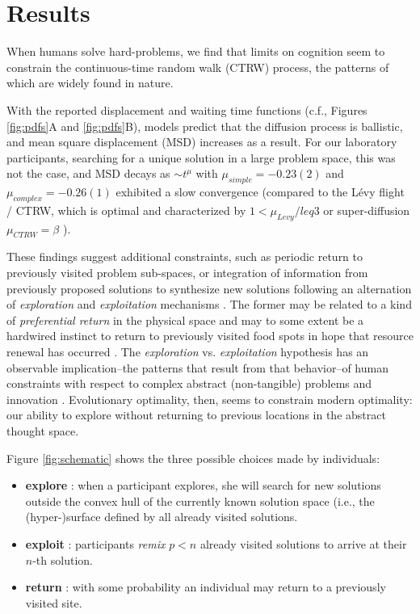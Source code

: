 \section{Results}
When humans solve hard-problems, we find that limits on cognition seem to constrain the continuous-time random walk (CTRW) process, the patterns of which are widely found in nature. 


With the reported displacement and waiting time functions (c.f., Figures \ref{fig:pdfs}A and \ref{fig:pdfs}B), models predict that the diffusion process is ballistic, and mean square displacement (MSD) increases as a result. For our laboratory participants, searching for a unique solution in a large problem space, this was not the case, and MSD decays as $\sim t^{\mu}$ with $\mu_{simple} =-0.23(2)$ and $\mu_{complex} =- 0.26(1)$ exhibited a slow convergence (compared to the L\'evy flight / CTRW, which is optimal and characterized by $1<\mu_{Levy} /leq 3$ or super-diffusion $\mu_{CTRW} = \beta$ \cite{21,23}). 

These findings suggest additional constraints, such as periodic return to previously visited problem sub-spaces, or integration of information from previously proposed solutions to synthesize new solutions following an alternation of {\it exploration} and {\it exploitation} mechanisms \cite{march1991exploration}. The former may be related to a kind of {\it preferential return} in the physical space \cite{song2010modelling} and may to some extent be a hardwired instinct to return to previously visited food spots in hope that resource renewal has occurred \cite{}. The {\it exploration} vs. {\it exploitation} hypothesis has an observable implication--the patterns that result from that behavior--of human constraints with respect to complex abstract (non-tangible) problems and innovation \cite{march1991exploration}.  Evolutionary optimality, then, seems to constrain modern optimality: our ability to explore without returning to previous locations in the abstract thought space.  

Figure \ref{fig:schematic} shows the three possible choices made by individuals:

\begin{itemize}
  \item {\bf explore} : when a participant explores, she will search for new solutions outside the convex hull of the currently known solution space (i.e., the (hyper-)surface defined by all already visited solutions. 
  \item {\bf exploit} : participants {\it remix} $p < n$ already visited solutions to arrive at their $n$-th solution.
  \item {\bf return} : with some probability an individual may return to a previously visited site. 
\end{itemize}


